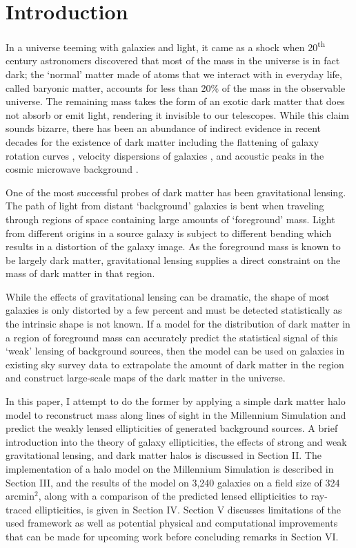 \documentclass[%
 reprint,
 amsmath,amssymb,
 aps,nofootinbib
]{revtex4-1}
\begin{document}

\section{Introduction}

In a universe teeming with galaxies and light, it came as a shock when 20\textsuperscript{th} century astronomers discovered that most of the mass in the universe is in fact dark; the `normal' matter made of atoms that we interact with in everyday life, called baryonic matter, accounts for less than 20\% of the mass in the observable universe. The remaining mass takes the form of an exotic dark matter that does not absorb or emit light, rendering it invisible to our telescopes. While this claim sounds bizarre, there has been an abundance of indirect evidence in recent decades for the existence of dark matter including the flattening of galaxy rotation curves \cite{rotation_curve}, velocity dispersions of galaxies \cite{zwicky}, and acoustic peaks in the cosmic microwave background \cite{planck_2015}.

One of the most successful probes of dark matter has been gravitational lensing. The path of light from distant `background' galaxies is bent when traveling through regions of space containing large amounts of `foreground' mass. Light from different origins in a source galaxy is subject to different bending which results in a distortion of the galaxy image. As the foreground mass is known to be largely dark matter, gravitational lensing supplies a direct constraint on the mass of dark matter in that region.

While the effects of gravitational lensing can be dramatic, the shape of most galaxies is only distorted by a few percent and must be detected statistically as the intrinsic shape is not known. If a model for the distribution of dark matter in a region of foreground mass can accurately predict the statistical signal of this `weak' lensing of background sources, then the model can be used on galaxies in existing sky survey data to extrapolate the amount of dark matter in the region and construct large-scale maps of the dark matter in the universe.

In this paper, I attempt to do the former by applying a simple dark matter halo model to reconstruct mass along lines of sight in the Millennium Simulation and predict the weakly lensed ellipticities of generated background sources. A brief introduction into the theory of galaxy ellipticities, the effects of strong and weak gravitational lensing, and dark matter halos is discussed in Section II. The implementation of a halo model on the Millennium Simulation is described in Section III, and the results of the model on 3,240 galaxies on a field size of 324 arcmin$^2$, along with a comparison of the predicted lensed ellipticities to ray-traced ellipticities, is given in Section IV.  Section V discusses limitations of the used framework as well as potential physical and computational improvements that can be made for upcoming work before concluding remarks in Section VI.
\end{document}
